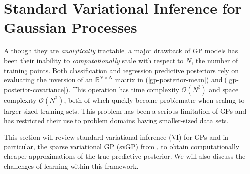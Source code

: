 \documentclass{article}
\numberwithin{equation}{section}
\begin{document}
\section{Standard Variational Inference for Gaussian Processes}\label{section:vi-gp}
Although they are \textit{analytically} tractable, a major drawback of GP models has been their inability to \textit{computationally} scale with respect to $N$, the number of training points.
Both classification and regression predictive posteriors rely on evaluating the inversion of an $\mathbb{R}^{N \times N}$ matrix in (\ref{gp-posterior-mean}) and (\ref{gp-posterior-covariance}).
This operation has time complexity  $\mathcal{O}(N^3)$ and space complexity $\mathcal{O}(N^2)$, both of which quickly become problematic when scaling to larger-sized training sets.
This problem has been a serious limitation of GPs and has restricted their use to problem domains having smaller-sized data sets.

This section will review standard variational inference (VI) for GPs and in particular, the sparse variational GP (svGP) from \cite{titsias2009variational}, to obtain computationally cheaper approximations of the true predictive posterior.
We will also discuss the challenges of learning within this framework.
\end{document}
